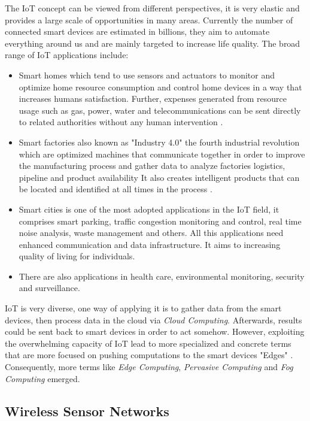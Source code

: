 The IoT concept can be viewed from different perspectives, it is very elastic and provides a large scale of opportunities in many areas. Currently the number of connected smart devices are estimated in billions, they aim to automate everything around us and are mainly targeted to increase life quality. The broad range of IoT applications include:
\begin{itemize}
\item Smart homes which tend to use sensors and actuators to monitor and optimize home resource consumption and control home devices in a way that increases humans satisfaction. Further, expenses generated from resource usage such as gas, power, water and telecommunications can be sent directly to related authorities without any human intervention \cite{Chan:2008:RSH:1377032.1377113}.  
\item Smart factories also known as "Industry 4.0" the fourth industrial revolution which are optimized machines that communicate together in order to improve the manufacturing process and gather data to analyze factories logistics, pipeline and product availability It also creates intelligent products that can be located and identified at all times in the process \cite{Gilchrist:2016:III:2994178}.

\item Smart cities is one of the most adopted applications in the IoT field, it comprises smart parking, traffic congestion monitoring and control, real time noise analysis, waste management and others.  All this applications need enhanced communication and data infrastructure. It aims to increasing quality of living for individuals\cite{6740844}. 

\item There are also applications in  health care, environmental monitoring, security and surveillance.
\end{itemize}

IoT is very diverse, one way of applying it is to gather data from the smart devices, then process data in the cloud via \textit{Cloud Computing}. Afterwards, results could be sent back to smart devices in order to act somehow. However, exploiting the overwhelming capacity of IoT lead to more specialized and concrete terms that are more focused on pushing computations to the smart devices "Edges" . Consequently, more terms like 
\textit{Edge Computing}, \textit{Pervasive Computing} and \textit{Fog Computing} emerged.


\subsection{Wireless Sensor Networks}
